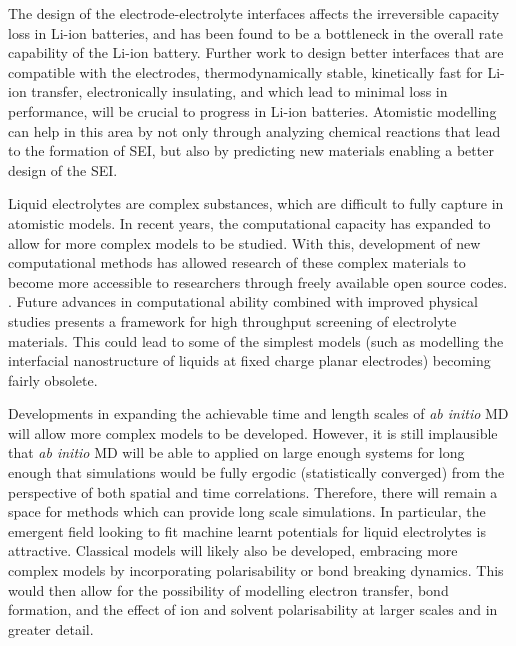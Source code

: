 \documentclass[../main.tex]{subfiles}
\begin{document}
The design of the electrode-electrolyte interfaces affects the irreversible capacity loss in Li-ion batteries, and has been found to be a bottleneck in the overall rate capability of the Li-ion battery. Further work to design better interfaces that are compatible with the electrodes, thermodynamically stable, kinetically fast for Li-ion transfer, electronically insulating, and which lead to minimal loss in performance, will be crucial to progress in Li-ion batteries. Atomistic modelling can help in this area by not only through analyzing chemical reactions that lead to the formation of SEI, but also by predicting new materials enabling a better design of the SEI.
    
Liquid electrolytes are complex substances, which are difficult to fully capture in atomistic models. In recent years, the computational capacity has expanded to allow for more complex models to be studied. With this, development of new computational methods has allowed research of these complex materials to become more accessible to researchers through freely available open source codes. \cite{merlet_highly_2013, borodin_interfacial_2014, Simoncelli_2018,marin-lafleche_metalwalls_2020}. Future advances in computational ability combined with improved physical studies presents a framework for high throughput screening of electrolyte materials. This could lead to some of the simplest models (such as modelling the interfacial nanostructure of liquids at fixed charge planar electrodes\cite{merlet_simulating_2013}) becoming fairly obsolete.

Developments in expanding the achievable time and length scales of \textit{ab initio} MD will allow more complex models to be developed. However, it is still implausible that \textit{ab initio} MD will be able to applied on large enough systems for long enough that simulations would be fully ergodic (statistically converged) from the perspective of both spatial and time correlations. Therefore, there will remain a space for methods which can provide long scale simulations. In particular, the emergent field looking to fit machine learnt potentials for liquid electrolytes is attractive\cite{shao2021modelling, hellstrom2016concentration, tovey2020dft}. Classical models will likely also be developed, embracing more complex models by incorporating polarisability\cite{marin-lafleche_metalwalls_2020,schroder_polarizable_2020} or bond breaking dynamics\cite{fedkin2019development,hossain2020lithium}. This would then allow for the possibility of modelling electron transfer, bond formation, and the effect of ion and solvent polarisability at larger scales and in greater detail.
    
\end{document}
